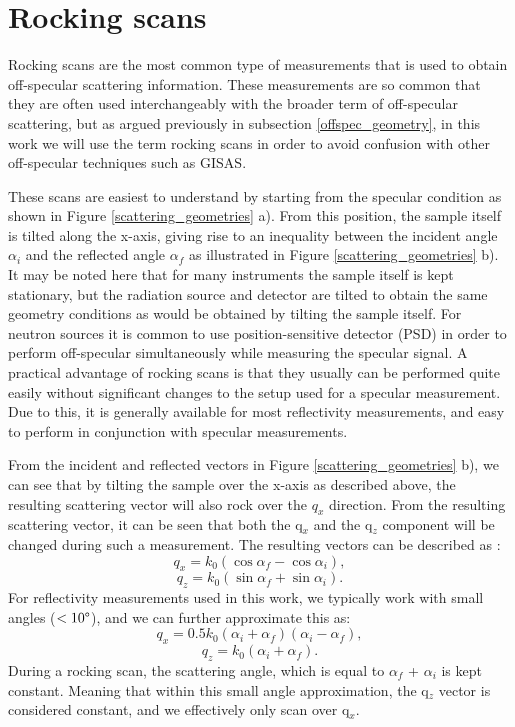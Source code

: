 \section{Rocking scans}\label{rocking_scan_section}
Rocking scans are the most common type of measurements that is used to obtain off-specular scattering information. These measurements are so common that they are often used interchangeably with the broader term of off-specular scattering, but as argued previously in subsection \ref{offspec_geometry}, in this work we will use the term rocking scans in order to avoid confusion with other off-specular techniques such as GISAS. 

These scans are easiest to understand by starting from the specular condition as shown in Figure \ref{scattering_geometries} a). From this position, the sample itself is tilted along the x-axis, giving rise to an inequality between the incident angle $\alpha_i$ and the reflected angle $\alpha_f$ as illustrated in Figure \ref{scattering_geometries} b). It may be noted here that for many instruments the sample itself is kept stationary, but the radiation source and detector are tilted to obtain the same geometry conditions as would be obtained by tilting the sample itself. For neutron sources it is common to use position-sensitive detector (PSD) in order to perform off-specular simultaneously while measuring the specular signal. A practical advantage of rocking scans is that they usually can be performed quite easily without significant changes to the setup used for a specular measurement. Due to this, it is generally available for most reflectivity measurements, and easy to perform in conjunction with specular measurements.

From the incident and reflected vectors in Figure \ref{scattering_geometries} b), we can see that by tilting the sample over the x-axis as described above, the resulting scattering vector will also rock over the $q_x$ direction. From the resulting scattering vector, it can be seen that both the q$_x$ and the q$_z$ component will be changed during such a measurement. The resulting vectors can be described as \cite{off-specular_neutrons}:
\begin{equation}
q_x = k_0(\cos{\alpha_f} - \cos{\alpha_i}),
\end{equation}
\begin{equation}
q_z = k_0(\sin{\alpha_f} + \sin{\alpha_i}).
\end{equation}
For reflectivity measurements used in this work, we typically work with small angles ($<10 \degree$), and we can further approximate this as:
\begin{equation}
q_x = 0.5k_0(\alpha_i + \alpha_f)(\alpha_i - \alpha_f),
\end{equation}
\begin{equation}
q_z = k_0(\alpha_i + \alpha_f).
\end{equation}
During a rocking scan, the scattering angle, which is equal to $\alpha_f$ + $\alpha_i$ is kept constant. Meaning that within this small angle approximation, the q$_z$ vector is considered constant, and we effectively only scan over q$_x$. 

